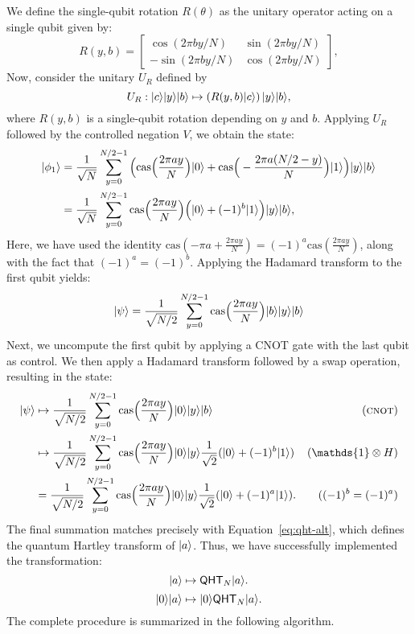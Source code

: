 \documentclass[11pt]{article}
\theoremstyle{definition}
\newcommand{\cas}{\mathrm{cas}}
\newcommand{\qht}{\mathsf{QHT}}
\begin{document}
We define the single-qubit rotation \( R(\theta) \) as the unitary operator acting on a single qubit given by:\begin{equation}
    \label{eq:sine-rot}
    R(y, b) = 
    \begin{bmatrix}
        \cos(2\pi b y / N) & \sin(2\pi b y / N) \\
        -\sin(2\pi b y / N) & \cos(2\pi b y / N)
    \end{bmatrix},
\end{equation}
Now, consider the unitary \( U_R \) defined by
\[
U_R : \lvert c\rangle\lvert y\rangle\lvert b\rangle \mapsto \left(R(y, b)\lvert c\rangle\right)\lvert y\rangle\lvert b\rangle,
\]
where \( R(y, b) \) is a single-qubit rotation depending on \( y \) and \( b \). Applying \( U_R \) followed by the controlled negation \( V \), we obtain the state:
\begin{align*}
    \ket{\phi_1}
    & = \frac{1}{\sqrt{N}} \sum_{y = 0}^{N / 2 - 1} \Big( \cas\Big( \frac{2\pi ay}{N} \Big) \ket{0} + \cas\Big(-\frac{2\pi a(N /2 - y)}{N} \Big) \ket{1} \Big) \ket{y} \ket{b} \\
    & = \frac{1}{\sqrt{N}} \sum_{y = 0}^{N / 2 - 1} \cas\Big( \frac{2\pi ay}{N} \Big) \Big( \ket{0} + (-1)^b \ket{1} \Big) \ket{y} \ket{b},
\end{align*}
Here, we have used the identity \( \cas\left(-\pi a + \frac{2\pi a y}{N}\right) = (-1)^a \cas\left(\frac{2\pi a y}{N}\right) \), along with the fact that \( (-1)^a = (-1)^b \). Applying the Hadamard transform to the first qubit yields:
\[
    \ket{\psi} = \frac{1}{\sqrt{N / 2}} \sum_{y = 0}^{N / 2 - 1} \cas\Big( \frac{2\pi ay}{N} \Big) \ket{b} \ket{y} \ket{b}
\]
Next, we uncompute the first qubit by applying a \textsc{CNOT} gate with the last qubit as control. We then apply a Hadamard transform followed by a swap operation, resulting in the state:
\begin{align*}
    \ket{\psi}
    & \mapsto \frac{1}{\sqrt{N / 2}} \sum_{y = 0}^{N / 2 - 1} \cas\Big( \frac{2\pi ay}{N} \Big) \ket{0} \ket{y} \ket{b} & (\textsc{cnot}) \\
    & \mapsto \frac{1}{\sqrt{N / 2}} \sum_{y = 0}^{N / 2 - 1} \cas\Big( \frac{2\pi ay}{N} \Big) \ket{0} \ket{y} \frac{1}{\sqrt{2}}(\ket{0} + (-1)^b \ket{1}) & (\mathds{1} \otimes H) \\
    & = \frac{1}{\sqrt{N / 2}} \sum_{y = 0}^{N / 2 - 1} \cas\Big( \frac{2\pi ay}{N} \Big) \ket{0} \ket{y} \frac{1}{\sqrt{2}}(\ket{0} + (-1)^a \ket{1}). & ((-1)^b = (-1)^a) \\
\end{align*}
The final summation matches precisely with Equation~\eqref{eq:qht-alt}, which defines the quantum Hartley transform of \( \lvert a\rangle \). Thus, we have successfully implemented the transformation:
\[
\ket{a} \mapsto \qht_N \ket{a}.
\]
\[ \ket{0}\ket{a} \mapsto \ket{0} \qht_N\ket{a}. \]
The complete procedure is summarized in the following algorithm.
\end{document}
